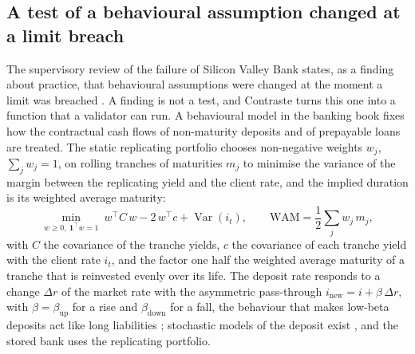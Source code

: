 \subsection{A test of a behavioural assumption changed at a limit breach}
\label{sec:bs8}

The supervisory review of the failure of Silicon Valley Bank states, as a finding about practice, that behavioural assumptions were changed at the moment a
limit was breached \citep{alm:fed2023}. A finding is not a test, and Contraste turns this one into a function that a validator
can run. A behavioural model in the banking book fixes how the contractual cash flows of non-maturity deposits and of prepayable loans are treated. The static replicating
portfolio chooses non-negative weights $w_j$, $\sum_j w_j=1$, on rolling tranches of maturities $m_j$ to minimise the variance of the margin between the replicating yield and the
client rate, and the implied duration is its weighted average maturity:
\begin{equation}
\min_{w\ge 0,\ \mathbf 1^{\top}w=1}\ w^{\top}C\,w-2\,w^{\top}c+\operatorname{Var}(i_t),\qquad
\mathrm{WAM}=\frac12\sum_{j}w_j\,m_j,
\label{eq:bs8-replicating}
\end{equation}
with $C$ the covariance of the tranche yields, $c$ the covariance of each tranche yield with the client rate $i_t$, and the factor one half the weighted average maturity of a tranche
that is reinvested evenly over its life. The deposit rate responds to a change $\Delta r$ of the market rate with the asymmetric pass-through
$i_{\mathrm{new}}=i+\beta\,\Delta r$, with $\beta=\beta_{\mathrm{up}}$ for a rise and $\beta_{\mathrm{down}}$ for a fall, the behaviour that makes low-beta deposits act like long
liabilities \citep{alm:drechsler2021}; stochastic models of the deposit exist \citep{alm:jarrow1998,alm:kalkbrener2004}, and the stored bank uses the
replicating portfolio.

